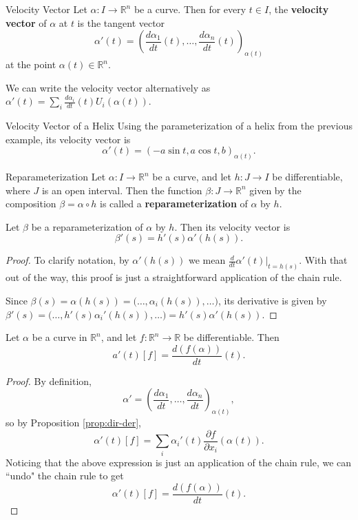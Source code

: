 \documentclass[10pt]{report}
\begin{document}
\begin{defn}{Velocity Vector}{}
Let $\alpha:I\to \mathbb{R}^n$ be a curve. Then for every $t \in I$, the \textbf{velocity vector} of $\alpha$ at $t$ is the tangent vector
\[
	\alpha'(t) = \left( \frac{d \alpha_1}{d t} (t), \dots, \frac{d \alpha_n}{d t} (t) \right)_{\alpha(t)}
\] at the point $\alpha(t) \in \mathbb{R}^n$.
\end{defn}

We can write the velocity vector alternatively as $\alpha'(t) = \sum_i \frac{d \alpha_i}{d t} (t) U_i(\alpha(t))$.

\begin{ex}{Velocity Vector of a Helix}{}
Using the parameterization of a helix from the previous example, its velocity vector is
\[
	\alpha'(t) = (-a \sin t, a \cos t, b)_{\alpha(t)}.
\]
\end{ex}

\begin{defn}{Reparameterization}{}
	Let $\alpha:I\to \mathbb{R}^n$ be a curve, and let $h:J\to I$ be differentiable, where $J$ is an open interval. Then the function $\beta:J\to \mathbb{R}^n$ given by the composition $\beta = \alpha \circ h$ is called a \textbf{reparameterization} of $\alpha$ by $h$.
\end{defn}

\begin{prop}
Let $\beta$ be a reparameterization of $\alpha$ by $h$. Then its velocity vector is
\[
	\beta'(s) = h'(s) \alpha'(h(s)).
\] 
\end{prop}
\begin{proof}
	To clarify notation, by $\alpha'(h(s))$ we mean $\frac{d }{d t} \alpha'(t) \big|_{t=h(s)}$. With that out of the way, this proof is just a straightforward application of the chain rule.

	Since $\beta(s) = \alpha(h(s)) = \big(\dots, \alpha_i(h(s)), \dots \big)$, its derivative is given by $\beta'(s) = \big(\dots, h'(s) \alpha_i'(h(s)) , \dots \big)=h'(s) \alpha'(h(s)).$
\end{proof}

\begin{prop}
Let $\alpha$ be a curve in $\mathbb{R}^n$, and let $f:\mathbb{R}^n\to \mathbb{R}$ be differentiable. Then
\[
	a'(t)[f] = \frac{d (f(\alpha))}{d t} (t).
\] 
\end{prop}
\begin{proof}
	By definition,
	\[
		\alpha' = \left( \frac{d \alpha_1}{d t} , \dots, \frac{d \alpha_n}{d t}  \right)_{\alpha(t)},
	\] so by Proposition \ref{prop:dir-der},
	\[
		\alpha'(t)[f] = \sum_i \alpha_i'(t) \frac{\partial f}{\partial x_i} (\alpha(t)).
	\] Noticing that the above expression is just an application of the chain rule, we can ``undo" the chain rule to get
	\[
		\alpha'(t)[f] = \frac{d (f(\alpha))}{d t} (t).
	\] 
\end{proof}
\end{document}
